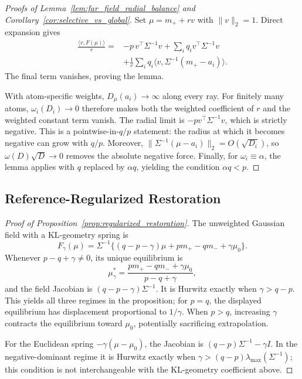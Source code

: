 \documentclass{article}
\theoremstyle{plain}
\theoremstyle{definition}
\theoremstyle{remark}
\begin{document}
\begin{proof}[Proofs of Lemma~\ref{lem:far_field_radial_balance} and
Corollary~\ref{cor:selective_vs_global}]
Set \(\mu=m_++rv\) with \(\|v\|_2=1\). Direct expansion gives
\begin{align}
\frac{\langle v,F(\mu)\rangle}{r}
={}&-p\,v^\top\Sigma^{-1}v
+\sum_iq_i v^\top\Sigma^{-1}v \\
&+\frac1r\sum_iq_i
\langle v,\Sigma^{-1}(m_+-a_i)\rangle.
\end{align}
The final term vanishes, proving the lemma.

With atom-specific weights, \(D_\mu(a_i)\to\infty\) along every ray.
For finitely many atoms, \(\omega_i(D_i)\to0\) therefore makes both the
weighted coefficient of \(r\) and the weighted constant term vanish.
The radial limit is
\(-p v^\top\Sigma^{-1}v\), which is strictly negative. This is a
pointwise-in-\(q/p\) statement: the radius at which it becomes negative
can grow with \(q/p\). Moreover,
\(\|\Sigma^{-1}(\mu-a_i)\|_2=O(\sqrt{D_i})\), so
\(\omega(D)\sqrt D\to0\) removes the absolute negative force. Finally,
for \(\omega_i\equiv\alpha\), the lemma applies with \(q\) replaced by
\(\alpha q\), yielding the condition \(\alpha q<p\).
\end{proof}

\subsection{Reference-Regularized Restoration}
\label{app:regularized_restoration}

\begin{proof}[Proof of Proposition~\ref{prop:regularized_restoration}]
The unweighted Gaussian field with a KL-geometry spring is
\[
F_\gamma(\mu)=\Sigma^{-1}
\{(q-p-\gamma)\mu+pm_+-qm_-+\gamma\mu_0\}.
\]
Whenever \(p-q+\gamma\ne0\), its unique equilibrium is
\[
\mu_\gamma^*
=\frac{pm_+-qm_-+\gamma\mu_0}{p-q+\gamma},
\]
and the field Jacobian is
\((q-p-\gamma)\Sigma^{-1}\). It is Hurwitz exactly when
\(\gamma>q-p\). This yields all three regimes in the proposition; for
\(p=q\), the displayed equilibrium has displacement proportional to
\(1/\gamma\). When \(p>q\), increasing \(\gamma\) contracts the
equilibrium toward \(\mu_0\), potentially sacrificing extrapolation.

For the Euclidean spring \(-\gamma(\mu-\mu_0)\), the Jacobian is
\((q-p)\Sigma^{-1}-\gamma I\). In the negative-dominant regime it is
Hurwitz exactly when
\(\gamma>(q-p)\lambda_{\max}(\Sigma^{-1})\); this condition is not
interchangeable with the KL-geometry coefficient above.
\end{proof}
\end{document}
